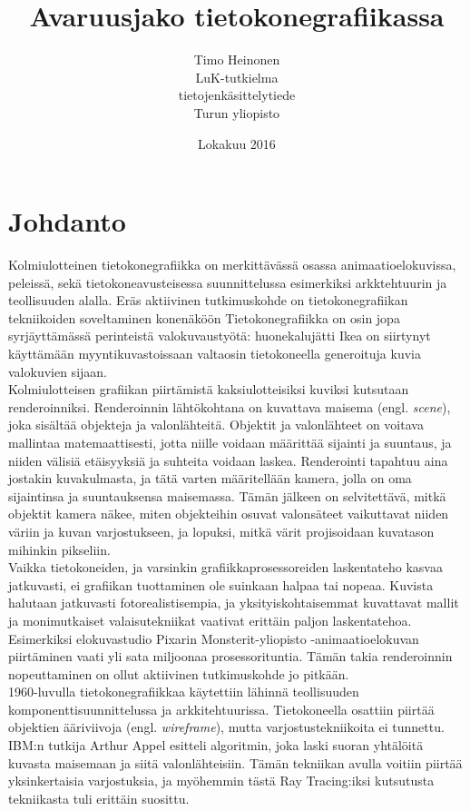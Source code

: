 \documentclass[a4paper,12pt, titlepage]{article}
\title{Avaruusjako tietokonegrafiikassa}
\author{Timo Heinonen \\LuK-tutkielma \\ tietojenkäsittelytiede \\ Turun yliopisto}
\date{Lokakuu 2016}
\theoremstyle{break}
\begin{document}
\maketitle

\setcounter{tocdepth}{2} %
\tableofcontents

\newpage
\section{Johdanto}

Kolmiulotteinen tietokonegrafiikka on merkittävässä osassa animaatioelokuvissa, peleissä, sekä tietokoneavusteisessa suunnittelussa esimerkiksi arkktehtuurin ja teollisuuden alalla. Eräs aktiivinen tutkimuskohde on tietokonegrafiikan tekniikoiden soveltaminen konenäköön \cite{hughes} Tietokonegrafiikka on osin jopa syrjäyttämässä perinteistä valokuvaustyötä: huonekalujätti Ikea on siirtynyt käyttämään myyntikuvastoissaan valtaosin tietokoneella generoituja kuvia valokuvien sijaan.\cite{ikea}\\

Kolmiulotteisen grafiikan piirtämistä kaksiulotteisiksi kuviksi kutsutaan renderoinniksi. Renderoinnin lähtökohtana on kuvattava maisema (engl. \emph{scene}), joka sisältää objekteja ja valonlähteitä. Objektit ja valonlähteet on voitava mallintaa matemaattisesti, jotta niille voidaan määrittää sijainti ja suuntaus, ja niiden välisiä etäisyyksiä ja suhteita voidaan laskea. Renderointi tapahtuu aina jostakin kuvakulmasta, ja tätä varten määritellään kamera, jolla on oma sijaintinsa ja suuntauksensa maisemassa. Tämän jälkeen on selvitettävä, mitkä objektit kamera näkee, miten objekteihin osuvat valonsäteet vaikuttavat niiden väriin ja kuvan varjostukseen, ja lopuksi, mitkä värit projisoidaan kuvatason mihinkin pikseliin.\cite{janke}\\

Vaikka tietokoneiden, ja varsinkin grafiikkaprosessoreiden laskentateho kasvaa jatkuvasti, ei grafiikan tuottaminen ole suinkaan halpaa tai nopeaa. Kuvista halutaan jatkuvasti fotorealistisempia, ja yksityiskohtaisemmat kuvattavat mallit ja monimutkaiset valaisutekniikat vaativat erittäin paljon laskentatehoa. Esimerkiksi elokuvastudio Pixarin Monsterit-yliopisto -animaatioelokuvan piirtäminen vaati yli sata miljoonaa prosessorituntia.\cite{monsterit} Tämän takia renderoinnin nopeuttaminen on ollut aktiivinen tutkimuskohde jo pitkään.\\

1960-luvulla tietokonegrafiikkaa käytettiin lähinnä teollisuuden komponenttisuunnittelussa ja arkkitehtuurissa. Tietokoneella osattiin piirtää objektien ääriviivoja (engl. \emph{wireframe}), mutta varjostustekniikoita ei tunnettu. IBM:n tutkija Arthur Appel esitteli algoritmin, joka laski suoran yhtälöitä kuvasta maisemaan ja siitä valonlähteisiin. Tämän tekniikan avulla voitiin piirtää yksinkertaisia varjostuksia, ja myöhemmin tästä Ray Tracing:iksi kutsutusta tekniikasta tuli erittäin suosittu.\cite{appel}\\
\end{document}
